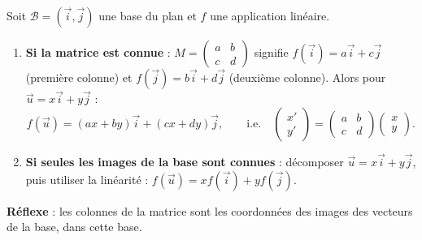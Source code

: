 \documentclass[11pt]{article}
\begin{document}
\begin{methode}
Soit $\mathcal{B} = (\vec{i}, \vec{j})$ une base du plan et $f$ une application linéaire.
\begin{enumerate}
\item \textbf{Si la matrice est connue} : $M = \begin{pmatrix} a & b \\ c & d \end{pmatrix}$ signifie $f(\vec{i}) = a\vec{i} + c\vec{j}$ (première colonne) et $f(\vec{j}) = b\vec{i} + d\vec{j}$ (deuxième colonne). Alors pour $\vec{u} = x\vec{i} + y\vec{j}$ :
\[ f(\vec{u}) = (ax + by)\vec{i} + (cx + dy)\vec{j}, \qquad \text{i.e.} \quad \begin{pmatrix} x' \\ y' \end{pmatrix} = \begin{pmatrix} a & b \\ c & d \end{pmatrix}\begin{pmatrix} x \\ y \end{pmatrix}. \]
\item \textbf{Si seules les images de la base sont connues} : décomposer $\vec{u} = x\vec{i} + y\vec{j}$, puis utiliser la linéarité : $f(\vec{u}) = x f(\vec{i}) + y f(\vec{j})$.
\end{enumerate}
\textbf{Réflexe} : les colonnes de la matrice sont les coordonnées des images des vecteurs de la base, dans cette base.
\end{methode}
\end{document}
